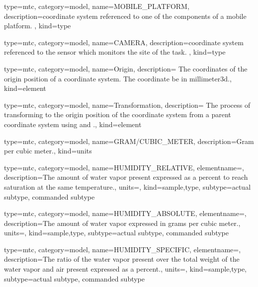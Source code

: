 {
  type=mtc,
  category=model,
  name={MOBILE\_PLATFORM},
  description={coordinate system referenced to one of the components of a mobile platform. },
  kind={type}
}


{
  type=mtc,
  category=model,
  name={CAMERA},
  description={coordinate system referenced to the sensor which monitors the site of the task. },
  kind={type}
}


{
  type=mtc,
  category=model,
  name={Origin},
  description={ The coordinates of the origin position of a coordinate system. The coordinate \MUST be in \gls{millimeter3d}.},
  kind={element}
}


{
  type=mtc,
  category=model,
  name={Transformation},
  description={ The process of transforming to the origin position of the coordinate system from a parent coordinate system using  and .},
  kind={element}
}


{
  type=mtc,
  category=model,
  name={GRAM/CUBIC\_METER},
  description={Gram per cubic meter.},
  kind={units}
}


{
  type=mtc,
  category=model,
  name={HUMIDITY\_RELATIVE},
  elementname=,
  description={The amount of water vapor present expressed as a percent to reach saturation at the same temperature.},
  units=,
  kind={sample,type},
  subtype={\gls{actual subtype}, \gls{commanded subtype}}
}


{
  type=mtc,
  category=model,
  name={HUMIDITY\_ABSOLUTE},
  elementname=,
  description={The amount of water vapor expressed in grams per cubic meter.},
  units=,
  kind={sample,type},
  subtype={\gls{actual subtype}, \gls{commanded subtype}}
}


{
  type=mtc,
  category=model,
  name={HUMIDITY\_SPECIFIC},
  elementname=,
  description={The ratio of the water vapor present over the total weight of the water vapor and air present expressed as a percent.},
  units=,
  kind={sample,type},
  subtype={\gls{actual subtype}, \gls{commanded subtype}}
}
